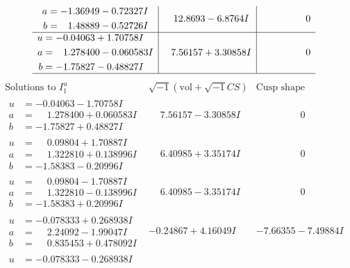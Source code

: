 \documentclass[1p]{elsarticle_modified}
\theoremstyle{definition}
\newcommand{\I}{\sqrt{-1}}
\begin{document}
$$\begin{array}{c|c|c}
\begin{aligned}
a &= -1.36949 - 0.72327 I \\
b &= \phantom{-}1.48889 - 0.52726 I\end{aligned}
 & \phantom{-}12.8693 - 6.8764 I & \phantom{-0.000000 } 0 \\ \hline\begin{aligned}
u &= -0.04063 + 1.70758 I \\
a &= \phantom{-}1.278400 - 0.060583 I \\
b &= -1.75827 - 0.48827 I\end{aligned}
 & \phantom{-}7.56157 + 3.30858 I & \phantom{-0.000000 } 0\\
 \hline 
 \end{array}$$\newpage$$\begin{array}{c|c|c}  
\text{Solutions to }I^u_{1}& \I (\text{vol} + \sqrt{-1}CS) & \text{Cusp shape}\\
 \hline 
\begin{aligned}
u &= -0.04063 - 1.70758 I \\
a &= \phantom{-}1.278400 + 0.060583 I \\
b &= -1.75827 + 0.48827 I\end{aligned}
 & \phantom{-}7.56157 - 3.30858 I & \phantom{-0.000000 } 0 \\ \hline\begin{aligned}
u &= \phantom{-}0.09804 + 1.70887 I \\
a &= \phantom{-}1.322810 + 0.138996 I \\
b &= -1.58383 - 0.20996 I\end{aligned}
 & \phantom{-}6.40985 + 3.35174 I & \phantom{-0.000000 } 0 \\ \hline\begin{aligned}
u &= \phantom{-}0.09804 - 1.70887 I \\
a &= \phantom{-}1.322810 - 0.138996 I \\
b &= -1.58383 + 0.20996 I\end{aligned}
 & \phantom{-}6.40985 - 3.35174 I & \phantom{-0.000000 } 0 \\ \hline\begin{aligned}
u &= -0.078333 + 0.268938 I \\
a &= \phantom{-}2.24092 - 1.99047 I \\
b &= \phantom{-}0.835453 + 0.478092 I\end{aligned}
 & -0.24867 + 4.16049 I & -7.66355 - 7.49884 I \\ \hline\begin{aligned}
u &= -0.078333 - 0.268938 I \\

\end{aligned}
\end{array}$$
\end{document}
